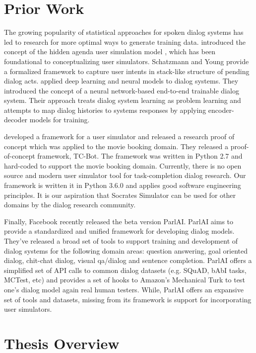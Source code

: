 \section{Prior Work}
\label{sec:priorworks}

The growing popularity of statistical approaches for spoken dialog systems has led to research for more optimal ways to generate training data. \cite{Schatzmann2009TheHA} introduced the concept of the hidden agenda user simulation model , which has been foundational to conceptualizing user simulators. Schatzmann and Young provide a formalized framework to capture user intents in stack-like structure of pending dialog acts. \cite{BordesW16} applied deep learning and neural models to dialog systems. They introduced the concept of a neural network-based end-to-end trainable dialog system. Their approach treats dialog system learning as problem learning and attempts to map dialog histories to systems responses by applying encoder-decoder models for training. 

\cite{li_usersim} developed a framework for a user simulator and released a research proof of concept which was applied to the movie booking domain. They released a proof-of-concept framework, TC-Bot. The framework was written in Python 2.7 and hard-coded to support the movie booking domain. Currently, there is no open source and modern user simulator tool for task-completion dialog research. Our framework is written it in Python 3.6.0 and applies good software engineering principles. It is our aspiration that Socrates Simulator can be used for other domains by the dialog research community. 

Finally, Facebook recently released the beta version ParlAI. ParlAI aims to provide a standardized and unified framework for developing dialog models. They’ve released a broad set of tools to support training and development of dialog systems for the following domain areas: question answering, goal oriented dialog, chit-chat dialog, visual qa/dialog and sentence completion. ParlAI offers a simplified set of API calls to common dialog datasets (e.g. SQuAD, bAbI tasks, MCTest, etc) and provides a set of hooks to Amazon’s Mechanical Turk to test one’s dialog model again real human testers. While, ParlAI offers an expansive set of tools and datasets, missing from its framework is support for incorporating user simulators. 

\section{Thesis Overview}

